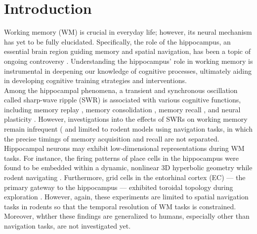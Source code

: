 \documentclass[final,3p,times,twocolumn]{elsarticle}
\begin{document}
\section{Introduction}
Working memory (WM) is crucial in everyday life; however, its neural mechanism has yet to be fully elucidated. Specifically, the role of the hippocampus, an essential brain region guiding memory and spatial navigation, has been a topic of ongoing controversy \cite{scoville_loss_1957} \cite{squire_legacy_2009}  \cite{boran_persistent_2019} \cite{kaminski_persistently_2017} \cite{kornblith_persistent_2017} \cite{faraut_dataset_2018} \cite{borders_hippocampus_2022} \cite{li_functional_2023} \cite{dimakopoulos_information_2022}. Understanding the hippocampus' role in working memory is instrumental in deepening our knowledge of cognitive processes, ultimately aiding in developing cognitive training strategies and interventions.
\\
\indent
Among the hippocampal phenomena, a transient and synchronous oscillation called sharp-wave ripple (SWR) \cite{buzsaki_hippocampal_2015} is associated with various cognitive functions, including memory replay \cite{wilson_reactivation_1994} \cite{nadasdy_replay_1999} \cite{lee_memory_2002} \cite{diba_forward_2007} \cite{davidson_hippocampal_2009}, memory consolidation \cite{girardeau_selective_2009} \cite{ego-stengel_disruption_2010} \cite{fernandez-ruiz_long-duration_2019} \cite{kim_corticalhippocampal_2022}, memory recall \cite{wu_hippocampal_2017} \cite{norman_hippocampal_2019} \cite{norman_hippocampal_2021}, and neural plasticity \cite{behrens_induction_2005} \cite{norimoto_hippocampal_2018}. However, investigations into the effects of SWRs on working memory remain infrequent (\cite{jadhav_awake_2012} and limited to rodent models using navigation tasks, in which the precise timings of memory acquisition and recall are not separated.
\\
\indent
Hippocampal neurons may exhibit low-dimensional representations during WM tasks. For instance, the firing patterns of place cells \cite{okeefe_hippocampus_1971} \cite{okeefe_place_1976} \cite{ekstrom_cellular_2003} \cite{kjelstrup_finite_2008} \cite{harvey_intracellular_2009} in the hippocampus were found to be embedded within a dynamic, nonlinear 3D hyperbolic geometry while rodent navigating \cite{zhang_hippocampal_2022}. Furthermore, grid cells in the entorhinal cortex (EC) --- the primary gateway to the hippocampus \cite{naber_reciprocal_2001} \cite{van_strien_anatomy_2009} \cite{strange_functional_2014} --- exhibited toroidal topology during exploration \cite{gardner_toroidal_2022}. However, again, these experiments are limited to spatial navigation tasks in rodents so that the temporal resolution of WM tasks is constrained. Moreover, whther these findings are generalized to humans, especially other than navigation tasks, are not investigated yet.
\end{document}
